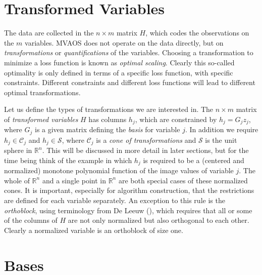 \documentclass[
  12pt,
  letterpaper,
]{scrbook}
\begin{document}
\section{Transformed Variables}\label{transformed-variables}

The data are collected in the \(n\times m\) matrix \(H\), which codes
the observations on the \(m\) variables. MVAOS does not operate on the
data directly, but on \emph{transformations} or \emph{quantifications}
of the variables. Choosing a transformation to minimize a loss function
is known as \emph{optimal scaling}. Clearly this so-called optimality is
only defined in terms of a specific loss function, with specific
constraints. Different constraints and different loss functions will
lead to different optimal transformations.

Let us define the types of transformations we are interested in. The
\(n\times m\) matrix of \emph{transformed variables} \(H\) has columns
\(h_j\), which are constrained by \(h_j=G_jz_j\), where \(G_j\) is a
given matrix defining the \emph{basis} for variable \(j\). In addition
we require \(h_j\in\mathcal{C}_j\) and \(h_j\in\mathcal{S}\), where
\(\mathcal{C}_j\) is a \emph{cone of transformations} and
\(\mathcal{S}\) is the unit sphere in \(\mathbb{R}^n\). This will be
discussed in more detail in later sections, but for the time being think
of the example in which \(h_j\) is required to be a (centered and
normalized) monotone polynomial function of the image values of variable
\(j\). The whole of \(\mathbb{R}^n\) and a single point in
\(\mathbb{R}^n\) are both special cases of these normalized cones. It is
important, especially for algorithm construction, that the restrictions
are defined for each variable separately. An exception to this rule is
the \emph{orthoblock}, using terminology from De Leeuw
(), which requires that all or some of
the columns of \(H\) are not only normalized but also orthogonal to each
other. Clearly a normalized variable is an orthoblock of size one.

\section{Bases}\label{bases}
\end{document}
